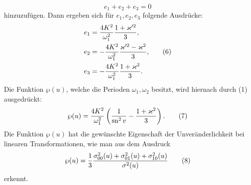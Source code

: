 \documentclass[11pt]{article}
\providecommand{\sn}{\operatorname{sn}}
\begin{document}
\begin{equation}
e_1+e_2+e_3=0
\tag{5}
\end{equation}
hinzuzufügen. Dann ergeben sich für $e_1,e_2,e_3$ folgende Ausdrücke:
\begin{equation}
\begin{aligned}
e_1&={4K^2\over\omega_1^2}{1+\varkappa'^2\over3},\\
e_2&=-{4K^2\over\omega_1^2}{\varkappa'^2-\varkappa^2\over3},\\
e_3&=-{4K^2\over\omega_1^2}{1+\varkappa^2\over3}.
\end{aligned}
\tag{6}
\end{equation}
Die Funktion $\wp(u)$, welche die Perioden $\omega_1,\omega_2$ besitzt, wird hiernach durch (1) ausgedrückt:
\begin{equation}
\wp(u)={4K^2\over\omega_1^2}\left({1\over\sn^2v}-{1+\varkappa^2\over3}\right).
\tag{7}
\end{equation}
Die Funktion $\wp(u)$ hat die gewünschte Eigenschaft der Unveränderlichkeit bei linearen Transformationen, wie man aus dem Ausdruck
\begin{equation}
\wp(u)={1\over3}{\sigma_{00}^2(u)+\sigma_{01}^2(u)+\sigma_{10}^2(u)\over\sigma^2(u)}
\tag{8}
\end{equation}
erkennt.
\end{document}
